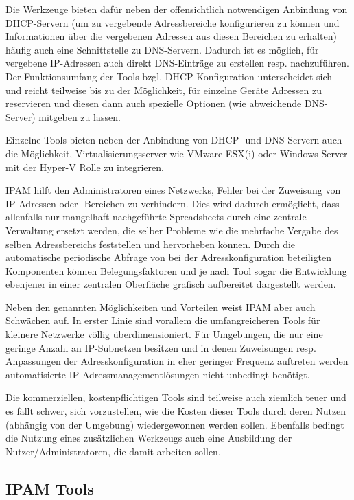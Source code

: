\documentclass[11pt,a4paper,parskip=half]{scrartcl}
\begin{document}
Die Werkzeuge bieten dafür neben der offensichtlich notwendigen Anbindung von DHCP-Servern (um zu vergebende Adressbereiche konfigurieren zu können und Informationen über die vergebenen Adressen aus diesen Bereichen zu erhalten) häufig auch eine Schnittstelle zu DNS-Servern. Dadurch ist es möglich, für vergebene IP-Adressen auch direkt DNS-Einträge zu erstellen resp. nachzuführen. Der Funktionsumfang der Tools bzgl. DHCP Konfiguration unterscheidet sich und reicht teilweise bis zu der Möglichkeit, für einzelne Geräte Adressen zu reservieren und diesen dann auch spezielle Optionen (wie abweichende DNS-Server) mitgeben zu lassen.

Einzelne Tools bieten neben der Anbindung von DHCP- und DNS-Servern auch die Möglichkeit, Virtualisierungsserver wie VMware ESX(i) oder Windows Server mit der Hyper-V Rolle zu integrieren.

IPAM hilft den Administratoren eines Netzwerks, Fehler bei der Zuweisung von IP-Adressen oder -Bereichen zu verhindern. Dies wird dadurch ermöglicht, dass allenfalls nur mangelhaft nachgeführte Spreadsheets durch eine zentrale Verwaltung ersetzt werden, die selber Probleme wie die mehrfache Vergabe des selben Adressbereichs feststellen und hervorheben können. Durch die automatische periodische Abfrage von bei der Adresskonfiguration beteiligten Komponenten können Belegungsfaktoren und je nach Tool sogar die Entwicklung ebenjener in einer zentralen Oberfläche grafisch aufbereitet dargestellt werden.

Neben den genannten Möglichkeiten und Vorteilen weist IPAM aber auch Schwächen auf. In erster Linie sind vorallem die umfangreicheren Tools für kleinere Netzwerke völlig überdimensioniert. Für Umgebungen, die nur eine geringe Anzahl an IP-Subnetzen besitzen und in denen Zuweisungen resp. Anpassungen der Adresskonfiguration in eher geringer Frequenz auftreten werden automatisierte IP-Adressmanagementlösungen nicht unbedingt benötigt.

Die kommerziellen, kostenpflichtigen Tools sind teilweise auch ziemlich teuer und es fällt schwer, sich vorzustellen, wie die Kosten dieser Tools durch deren Nutzen (abhängig von der Umgebung) wiedergewonnen werden sollen. Ebenfalls bedingt die Nutzung eines zusätzlichen Werkzeugs auch eine Ausbildung der Nutzer/Administratoren, die damit arbeiten sollen.

\subsection{IPAM Tools}
\end{document}

